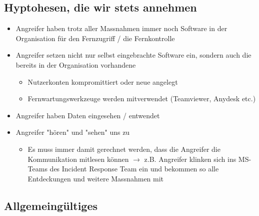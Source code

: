 \subsection{Hyptohesen, die wir stets annehmen}
\begin{itemize}
    \item Angreifer haben trotz aller Massnahmen immer noch Software in der Organisation für den Fernzugriff / die Fernkontrolle
    \item Angreifer setzen nicht nur selbst eingebrachte Software ein, sondern auch die bereits in der Organisation vorhandene
    \begin{itemize}
        \item Nutzerkonten kompromittiert oder neue angelegt
        \item Fernwartungswerkzeuge werden mitverwendet (Teamviewer, Anydesk etc.)
    \end{itemize}
    \item Angreifer haben Daten eingesehen / entwendet
    \item Angreifer "hören" und "sehen" uns zu
    \begin{itemize}
        \item Es muss immer damit gerechnet werden, dass die Angreifer die Kommunikation mitlesen können $\rightarrow$ z.B. Angreifer klinken sich ins MS-Teams des Incident Response Team ein und bekommen so alle Entdeckungen und weitere Massnahmen mit
    \end{itemize}
\end{itemize}

\subsection{Allgemeingültiges}

